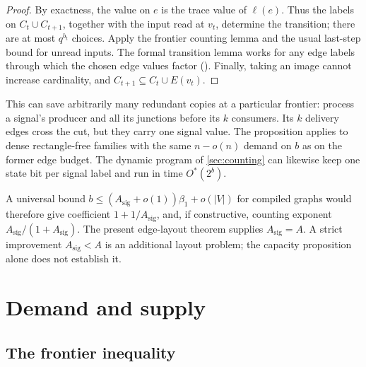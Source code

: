 \documentclass[11pt]{article}
\newcommand{\leanrefs}[1]{{\unskip\nobreak\hfil\penalty50\hskip1em\null\nobreak\hfil
  {\normalfont\small #1}\parfillskip=0pt\finalhyphendemerits=0\par}}
\newcommand{\leanref}[1]{\leanrefs{\lean{#1}}}
\theoremstyle{plain}
\theoremstyle{definition}
\theoremstyle{remark}
\newcommand{\rd}{\mathrm{read}}
\begin{document}

\begin{proof}
By exactness, the value on $e$ is the trace value of $\ell(e)$. Thus the labels on
$C_t\cup C_{t+1}$, together with the input read at $v_t$, determine the transition; there are
at most $q^{b_t}$ choices. Apply the frontier counting lemma and the usual last-step bound
for unread inputs. The formal transition lemma works for any edge labels through which the
chosen edge values factor (). Finally,
taking an image cannot increase cardinality, and $C_{t+1}\subseteq C_t\cup E(v_t)$.
\end{proof}

This can save arbitrarily many redundant copies at a particular frontier: process a signal's
producer and all its junctions before its $k$ consumers. Its $k$ delivery edges cross the cut,
but they carry one signal value. The proposition applies to dense rectangle-free families
with the same $n-o(n)$ demand on $b$ as on the former edge budget. The dynamic program of
\cref{sec:counting} can likewise keep one state bit per signal label and run in time
$O^*(2^b)$.

A universal bound $b\le(A_{\mathrm{sig}}+o(1))\beta_1+o(|V|)$ for compiled graphs would
therefore give coefficient $1+1/A_{\mathrm{sig}}$, and, if constructive, counting exponent
$A_{\mathrm{sig}}/(1+A_{\mathrm{sig}})$. The present edge-layout theorem supplies
$A_{\mathrm{sig}}=A$. A strict improvement $A_{\mathrm{sig}}<A$ is an additional layout problem;
the capacity proposition alone does not establish it.

\section{Demand and supply}
\label{sec:lowerbound}

\subsection{The frontier inequality}
\end{document}
